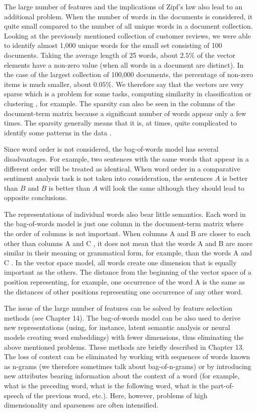\documentclass[11pt,openany,executivepaper]{book}
\begin{document}
The large number of features and the implications of Zipf's law also lead to an additional problem. When the number of words in the documents is considered, it quite small compared to the number of all unique words in a document collection. Looking at the previously mentioned collection of customer reviews, we were able to identify almost 1,000 unique words for the small set consisting of 100 documents. Taking the average length of 25 words, about $2.5 \%$ of the vector elements have a non-zero value (when all words in a document are distinct). In the case of the largest collection of 100,000 documents, the percentage of non-zero items is much smaller, about $0.05 \%$. We therefore say that the vectors are very sparse which is a problem for some tasks, computing similarity in classification or clustering \cite{177}, for example. The sparsity can also be seen in the columns of the document-term matrix because a significant number of words appear only a few times. The sparsity generally means that it is, at times, quite complicated to identify some patterns in the data \cite{87}.

Since word order is not considered, the bag-of-words model has several disadvantages. For example, two sentences with the same words that appear in a different order will be treated as identical. When word order in a comparative sentiment analysis task is not taken into consideration, the sentences $A$ is better than $B$ and $B$ is better than $A$ will look the same although they should lead to opposite conclusions.

The representations of individual words also bear little semantics. Each word in the bag-of-words model is just one column in the document-term matrix where the order of columns is not important. When columns A and B are closer to each\\
other than columns A and C , it does not mean that the words A and B are more similar in their meaning or grammatical form, for example, than the words A and C . In the vector space model, all words create one dimension that is equally important as the others. The distance from the beginning of the vector space of a position representing, for example, one occurrence of the word A is the same as the distances of other positions representing one occurrence of any other word.

The issue of the large number of features can be solved by feature selection methods (see Chapter 14). The bag-of-words model can be also used to derive new representations (using, for instance, latent semantic analysis or neural models creating word embeddings) with fewer dimensions, thus eliminating the above mentioned problems. These methods are briefly described in Chapter 13. The loss of context can be eliminated by working with sequences of words known as n-grams (we therefore sometimes talk about bag-of-n-grams) or by introducing new attributes bearing information about the context of a word (for example, what is the preceding word, what is the following word, what is the part-of-speech of the previous word, etc.). Here, however, problems of high dimensionality and sparseness are often intensified.
\end{document}

